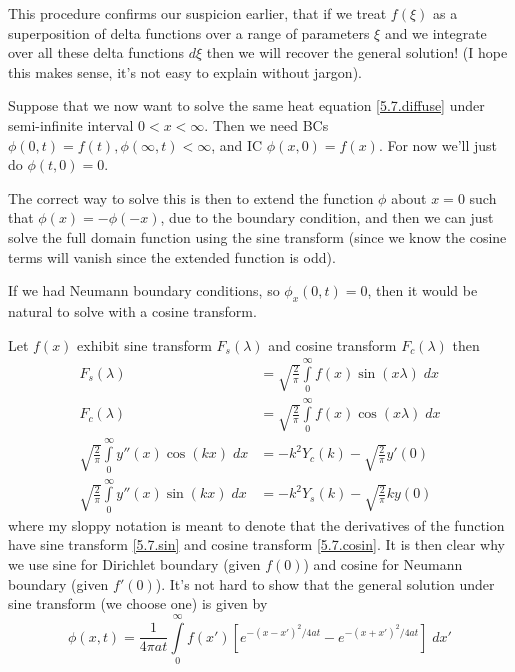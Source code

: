\documentclass[10pt]{report}
\begin{document}
This procedure confirms our suspicion earlier, that if we treat $f(\xi)$ as a superposition of delta functions over a range of parameters $\xi$ and we integrate over all these delta functions $d\xi$ then we will recover the general solution! (I hope this makes sense, it's not easy to explain without jargon). 

Suppose that we now want to solve the same heat equation \eqref{5.7.diffuse} under semi-infinite interval $0 < x < \infty$. Then we need BCs $\phi(0,t) = f(t), \phi(\infty,t) < \infty$, and IC $\phi(x,0) = f(x)$. For now we'll just do $\phi(t,0) = 0$. 

The correct way to solve this is then to extend the function $\phi$ about $x=0$ such that $\phi(x) = -\phi(-x)$, due to the boundary condition, and then we can just solve the full domain function using the sine transform (since we know the cosine terms will vanish since the extended function is odd).

If we had Neumann boundary conditions, so $\phi_x(0,t) = 0$, then it would be natural to solve with a cosine transform.

Let $f(x)$ exhibit sine transform $F_s(\lambda)$ and cosine transform $F_c(\lambda)$ then
\begin{align}
    F_s(\lambda) &= \sqrt{\frac{2}{\pi}}\int\limits_0^{\infty}f(x)\sin(x\lambda)\;dx\\
    F_c(\lambda) &= \sqrt{\frac{2}{\pi}}\int\limits_0^{\infty}f(x)\cos(x\lambda)\;dx\\
    \sqrt{\frac{2}{\pi}}\int\limits_{0}^{\infty}y''(x)\cos(kx)\;dx &= -k^2 Y_c(k) - \sqrt{\frac{2}{\pi}}y'(0)\label{5.7.cosin}\\
    \sqrt{\frac{2}{\pi}}\int\limits_{0}^{\infty}y''(x)\sin(kx)\;dx &= -k^2 Y_s(k) - \sqrt{\frac{2}{\pi}}ky(0)\label{5.7.sin}
\end{align}
where my sloppy notation is meant to denote that the  derivatives of the function have sine transform \eqref{5.7.sin} and cosine transform \eqref{5.7.cosin}. It is then clear why we use sine for Dirichlet boundary (given $f(0)$) and cosine for Neumann boundary (given $f'(0)$). It's not hard to show that the general solution under sine transform (we choose one) is given by
\begin{equation}
    \phi(x,t) = \frac{1}{4\pi at}\int\limits_{0}^{\infty}f(x')\left[ e^{-(x - x')^2/4at} - e^{-(x + x')^2/4at} \right]\;dx'
\end{equation}
\end{document}

